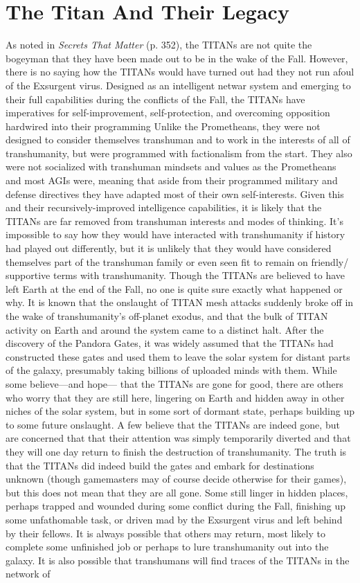 \section{The Titan And Their Legacy} 

As noted in \textit{Secrets That Matter} (p. 352), the TITANs are not quite the bogeyman that they have been made out to be in the wake of the Fall. However, there is no saying how the TITANs would have turned out had they not run afoul of the Exsurgent virus. Designed as an intelligent netwar system and emerging to their full capabilities during the conflicts of the Fall, the TITANs have imperatives for self-improvement, self-protection, and overcoming opposition hardwired into their programming Unlike the Prometheans, they were not designed to consider themselves transhuman and to work in the interests of all of transhumanity, but were programmed with factionalism from the start. They also were not socialized with transhuman mindsets and values as the Prometheans and most AGIs were, meaning that aside from their programmed military and defense directives they have adapted most of their own self-interests. Given this and their recursively-improved intelligence capabilities, it is likely that the TITANs are far removed from transhuman interests and modes of thinking. It's impossible to say how they would have interacted with transhumanity if history had played out differently, but it is unlikely that they would have considered themselves part of the transhuman family or even seen fit to remain on friendly/ supportive terms with transhumanity. Though the TITANs are believed to have left Earth at the end of the Fall, no one is quite sure exactly what happened or why. It is known that the onslaught of TITAN mesh attacks suddenly broke off in the wake of transhumanity's off-planet exodus, and that the bulk of TITAN activity on Earth and around the system came to a distinct halt. After the discovery of the Pandora Gates, it was widely assumed that the TITANs had constructed these gates and used them to leave the solar system for distant parts of the galaxy, presumably taking billions of uploaded minds with them. While some believe—and hope— that the TITANs are gone for good, there are others who worry that they are still here, lingering on Earth and hidden away in other niches of the solar system, but in some sort of dormant state, perhaps building up to some future onslaught. A few believe that the TITANs are indeed gone, but are concerned that that their attention was simply temporarily diverted and that they will one day return to finish the destruction of transhumanity. The truth is that the TITANs did indeed build the gates and embark for destinations unknown (though gamemasters may of course decide otherwise for their games), but this does not mean that they are all gone. Some still linger in hidden places, perhaps trapped and wounded during some conflict during the Fall, finishing up some unfathomable task, or driven mad by the Exsurgent virus and left behind by their fellows. It is always possible that others may return, most likely to complete some unfinished job or perhaps to lure transhumanity out into the galaxy. It is also possible that transhumans will find traces of the TITANs in the network of 